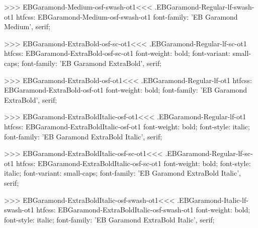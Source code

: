 {{{{{{{>>>
\<EBGaramond-Medium-osf-swash-ot1\><<<
.EBGaramond-Regular-lf-swash-ot1
htfcss:  EBGaramond-Medium-osf-swash-ot1  font-family: 'EB Garamond Medium', serif;

>>>
\<EBGaramond-ExtraBold-osf-sc-ot1\><<<
.EBGaramond-Regular-lf-sc-ot1
htfcss:  EBGaramond-ExtraBold-osf-sc-ot1  font-weight: bold; font-variant: small-caps; font-family: 'EB Garamond ExtraBold', serif;

>>>
\<EBGaramond-ExtraBold-osf-ot1\><<<
.EBGaramond-Regular-lf-ot1
htfcss:  EBGaramond-ExtraBold-osf-ot1  font-weight: bold; font-family: 'EB Garamond ExtraBold', serif;

>>>
\<EBGaramond-ExtraBoldItalic-osf-ot1\><<<
.EBGaramond-Regular-lf-ot1
htfcss:  EBGaramond-ExtraBoldItalic-osf-ot1  font-weight: bold; font-style: italic; font-family: 'EB Garamond ExtraBold Italic', serif;

>>>
\<EBGaramond-ExtraBoldItalic-osf-sc-ot1\><<<
.EBGaramond-Regular-lf-sc-ot1
htfcss:  EBGaramond-ExtraBoldItalic-osf-sc-ot1  font-weight: bold; font-style: italic; font-variant: small-caps; font-family: 'EB Garamond ExtraBold Italic', serif;

>>>
\<EBGaramond-ExtraBoldItalic-osf-swash-ot1\><<<
.EBGaramond-Italic-lf-swash-ot1
htfcss:  EBGaramond-ExtraBoldItalic-osf-swash-ot1  font-weight: bold; font-style: italic; font-family: 'EB Garamond ExtraBold Italic', serif;

}}}}}}}
